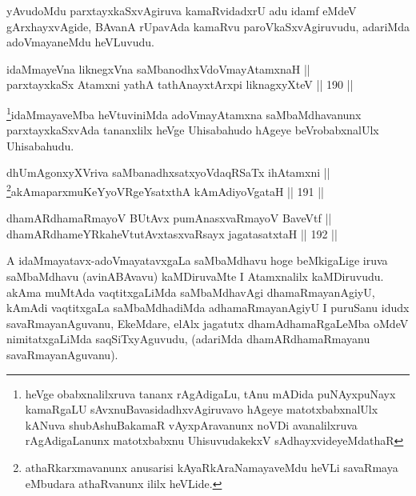 \begin{artha}
yAvudoMdu parxtayxkaSxvAgiruva kamaRvidadxrU adu idamf eMdeV
gArxhayxvAgide, BAvanA rUpavAda kamaRvu paroVkaSxvAgiruvudu, adariMda
adoVmayaneMdu heVLuvudu.
\end{artha}

\begin{shl}
idaMmayeVna liknegxVna saMbanodhxV\s doVmayAtamxnaH || \\
parxtayxkaSx Atamxni yathA tathA\s nayxtArxpi liknagxyXteV \hfill || 190 ||  
\end{shl}

\begin{artha}
\footnote{heVge obabxnalilxruva tananx rAgAdigaLu, tAnu mADida
puNAyxpuNayx kamaRgaLU sAvxnuBavasidadhxvAgiruvavo hAgeye
matotxbabxnalUlx kANuva shubAshuBakamaR vAyxpAravanunx noVDi
avanalilxruva rAgAdigaLanunx matotxbabxnu UhisuvudakekxV sAdhayxvideyeMdathaR}idaMmayaveMba heVtuviniMda adoVmayAtamxna saMbaMdhavanunx parxtayxkaSxvAda tananxlilx heVge Uhisabahudo hAgeye beVrobabxnalUlx Uhisabahudu.
\end{artha}


\begin{shl}
dhUmAgonxyXVriva saMbanadhxsatxyoVdaqRSaTx ihA\s \s tamxni || \\
\footnote{athaRkarxmavanunx anusarisi kAyaRkAraNamayaveMdu heVLi
savaRmaya eMbudara athaRvanunx ililx heVLide.}akAmaparxmuKeYyoVRgeYsatxthA kAmAdiyoVgataH \hfill || 191 || 
\end{shl}


\begin{shl}
dhamARdhamaRmayoV BUtAvx pumAnasxvaRmayoV BaveVtf || \\
dhamARdhameYRkaheVtutAvxtasxvaRsayx jagatasatxtaH \hfill || 192 ||  
\end{shl}

\begin{artha}
A idaMmayatavx-adoVmayatavxgaLa saMbaMdhavu hoge
beMkigaLige iruva saMbaMdhavu (avinABAvavu) kaMDiruvaMte I Atamxnalilx
kaMDiruvudu. akAma muMtAda vaqtitxgaLiMda  saMbaMdhavAgi
dhamaRmayanAgiyU, kAmAdi vaqtitxgaLa saMbaMdhadiMda adhamaRmayanAgiyU
I puruSanu idudx savaRmayanAguvanu, EkeMdare, elAlx jagatutx
dhamAdhamaRgaLeMba oMdeV nimitatxgaLiMda saqSiTxyAguvudu, (adariMda
dhamARdhamaRmayanu savaRmayanAguvanu).
\end{artha}



